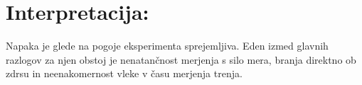 \documentclass[a4paper]{article}
\begin{document}
\section*{Interpretacija:}

Napaka je glede na pogoje eksperimenta sprejemljiva. Eden izmed glavnih razlogov za njen obstoj je nenatančnost merjenja s silo mera, branja direktno ob zdrsu in neenakomernost vleke v času merjenja trenja.
\end{document}
